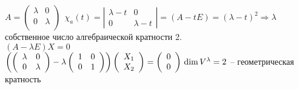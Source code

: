 \begin{Example}
	$A = \left(\begin{array}{cc}
		\lambda & 0\\
		0 & \lambda\\
	\end{array}
	\right) \ \ \chi_a(t) = \left|\begin{array}{cc}
		\lambda - t & 0\\
		0 & \lambda -t
	\end{array}\right| = (A-tE) = (\lambda - t)^2 \Rightarrow \lambda$ собственное число алгебраической кратности 2.\\
	$(A - \lambda E)X = 0$\\
	$\left( \left(\begin{array}{cc}
		\lambda & 0\\
		0 & \lambda
	\end{array}\right) - \lambda \left(\begin{array}{cc}
		1 & 0\\
		0 & 1
	\end{array}\right)\right) \left( \begin{array}{c}
		X_1\\
		X_2
	\end{array}\right) = \left( \begin{array}{c}
		0\\
		0
	\end{array} \right)\\
	\dim V^{\lambda} = 2$ -- геометрическая кратность
\end{Example}

